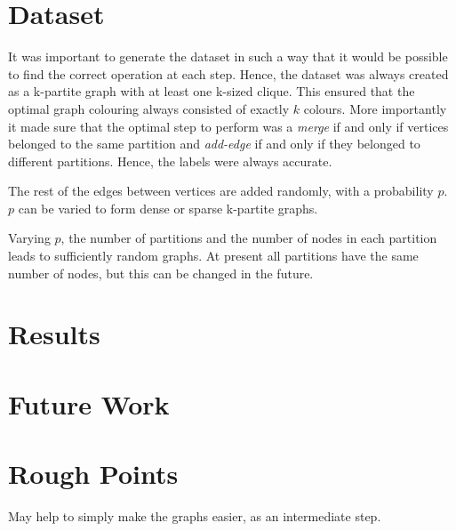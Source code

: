 \documentclass[a4paper]{report}
\begin{document}
\section{Dataset}
It was important to generate the dataset in such a way that it would be possible to find the correct
operation at each step. Hence, the dataset was always created as a k-partite graph with at least one
k-sized clique. This ensured that the optimal graph colouring always consisted of exactly $k$ colours.
More importantly it made sure that the optimal step to perform was a \textit{merge} if and only if vertices
belonged to the same partition and \textit{add-edge} if and only if they belonged to different partitions. Hence, the labels
were always accurate.

The rest of the edges between vertices are added randomly, with a probability $p$. $p$ can be varied
to form dense or sparse k-partite graphs.

Varying $p$, the number of partitions and the number of nodes in each partition leads to sufficiently
random graphs. At present all partitions have the same number of nodes, but this can be changed in the future.

\section{Results}
\section{Future Work}
\section{Rough Points}
May help to simply make the graphs easier, as an intermediate step.
\end{document}

